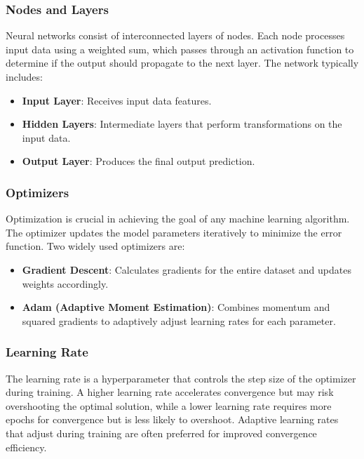 \subsubsection{Nodes and Layers}

Neural networks consist of interconnected layers of nodes. Each node processes input data using a weighted sum, which passes through an activation function to determine if the output should propagate to the next layer. The network typically includes:

\begin{itemize}
    \item \textbf{Input Layer}: Receives input data features.
    \item \textbf{Hidden Layers}: Intermediate layers that perform transformations on the input data.
    \item \textbf{Output Layer}: Produces the final output prediction.
\end{itemize}

\subsubsection{Optimizers}

Optimization is crucial in achieving the goal of any machine learning algorithm. The optimizer updates the model parameters iteratively to minimize the error function. Two widely used optimizers are:

\begin{itemize}
    \item \textbf{Gradient Descent}: Calculates gradients for the entire dataset and updates weights accordingly.
    \item \textbf{Adam (Adaptive Moment Estimation)}: Combines momentum and squared gradients to adaptively adjust learning rates for each parameter.
\end{itemize}

\subsubsection{Learning Rate}

The learning rate is a hyperparameter that controls the step size of the optimizer during training. A higher learning rate accelerates convergence but may risk overshooting the optimal solution, while a lower learning rate requires more epochs for convergence but is less likely to overshoot. Adaptive learning rates that adjust during training are often preferred for improved convergence efficiency.

